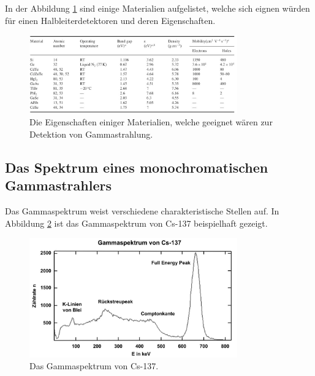 In der Abbildung \ref{fig:halbleitermatrialien} sind einige Materialien aufgelistet, welche sich eignen würden für einen Halbleiterdetektoren und deren Eigenschaften.

\begin{figure}[H]
    \centering
    \includegraphics[width=0.8\textwidth]{content/grafik/passende.jpg}
    \caption{Die Eigenschaften einiger Materialien, welche geeignet wären zur Detektion von Gammastrahlung.\cite{gamma_ray}}
    \label{fig:halbleitermatrialien}
\end{figure}

\subsection{Das Spektrum eines monochromatischen Gammastrahlers}
\label{sec:Gammastrahlung}

Das Gammaspektrum weist verschiedene charakteristische Stellen auf. In Abbildung \ref{fig:gamma-cs} ist das Gammaspektrum von
Cs-137 beispielhaft gezeigt.

\begin{figure}[H]
    \centering
    \includegraphics[width=0.8\textwidth]{content/grafik/Gammaspektrum.jpg}
    \caption{Das Gammaspektrum von Cs-137. \cite{Gammaspektrum}}
    \label{fig:gamma-cs}
\end{figure}

